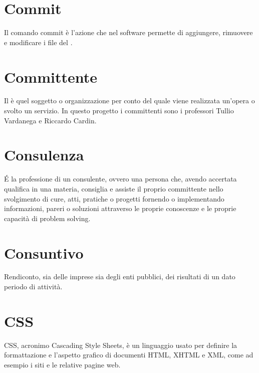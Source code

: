 \section{Commit}\label{sec:Commits}
Il comando commit è l'azione che nel software  permette di aggiungere, rimuovere e modificare i file del .

\section{Committente}\label{sec:Committenti}
Il  è quel soggetto o organizzazione per conto del quale viene realizzata un'opera o svolto un servizio. In questo progetto i committenti sono i professori Tullio Vardanega e Riccardo Cardin.

\section{Consulenza}\label{sec:Consulenze}
É la professione di un consulente, ovvero una persona che, avendo accertata qualifica in una materia, consiglia e assiste il proprio committente nello svolgimento di cure, atti, pratiche o progetti fornendo o implementando informazioni, pareri o soluzioni attraverso le proprie conoscenze e le proprie capacità di problem solving.

\section{Consuntivo}\label{sec:Consuntivi}
Rendiconto, sia delle imprese sia degli enti pubblici, dei risultati di un dato periodo di attività.

\section{CSS}\label{sec:Cascading Style Sheets}
CSS, acronimo Cascading Style Sheets, è un linguaggio usato per definire la formattazione e l'aspetto grafico di documenti HTML, XHTML e XML, come ad esempio i siti e le relative pagine web.